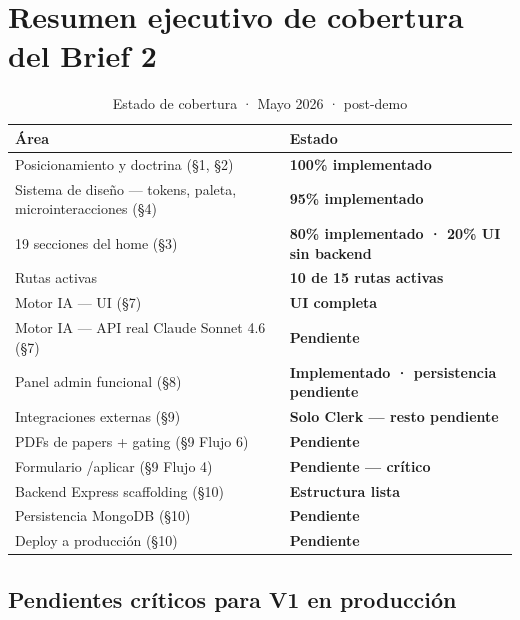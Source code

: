 \documentclass[11pt, a4paper]{article}
\begin{document}
\newpage


\section*{Resumen ejecutivo de cobertura del Brief 2}

\begin{table}[h]
\centering
\begin{tabularx}{\linewidth}{X >{\bfseries\small}l}
\toprule
Área & Estado \\
\midrule
Posicionamiento y doctrina (§1, §2) & \color{accent}100\% implementado \\
Sistema de diseño — tokens, paleta, microinteracciones (§4) & \color{accent}95\% implementado \\
19 secciones del home (§3) & \color{accent2}80\% implementado · 20\% UI sin backend \\
Rutas activas & \color{accent2}10 de 15 rutas activas \\
Motor IA — UI (§7) & \color{accent}UI completa \\
Motor IA — API real Claude Sonnet 4.6 (§7) & \color{danger}Pendiente \\
Panel admin funcional (§8) & \color{accent}Implementado · persistencia pendiente \\
Integraciones externas (§9) & \color{danger}Solo Clerk — resto pendiente \\
PDFs de papers + gating (§9 Flujo 6) & \color{danger}Pendiente \\
Formulario /aplicar (§9 Flujo 4) & \color{danger}Pendiente — crítico \\
Backend Express scaffolding (§10) & \color{accent}Estructura lista \\
Persistencia MongoDB (§10) & \color{danger}Pendiente \\
Deploy a producción (§10) & \color{danger}Pendiente \\
\bottomrule
\end{tabularx}
\caption{Estado de cobertura · Mayo 2026 · post-demo}
\end{table}

\subsection*{Pendientes críticos para V1 en producción}
\end{document}
